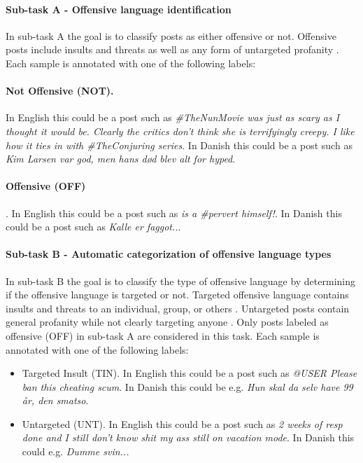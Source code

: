 \documentclass{article}
\begin{document}
\paragraph{Sub-task A - Offensive language identification}\label{ssec:offensEvalSubA}
In sub-task A the goal is to classify posts as either offensive or not. Offensive posts include insults and threats as well as any form of untargeted profanity \cite{zampieri2019semeval}. Each sample is annotated with one of the following labels:

\paragraph{Not Offensive (NOT).} In English this could be a post such as \textit{\#TheNunMovie was just as scary as I thought it would be. Clearly the critics don't think she is terrifyingly creepy. I like how it ties in with \#TheConjuring series}. In Danish this could be a post such as \textit{Kim Larsen var god, men hans d{\o}d blev alt for hyped}. 
\paragraph{Offensive (OFF)}. In English this could be a post such as \textit{\@USER is a \#pervert himself!}. In Danish this could be a post such as \textit{Kalle er faggot..}. 


\paragraph{Sub-task B - Automatic categorization of offensive language types}\label{ssec:offensEvalSubB}
In sub-task B the goal is to classify the type of offensive language by determining if the offensive language is targeted or not. Targeted offensive language contains insults and threats to an individual, group, or others \cite{zampieri2019semeval}. Untargeted posts contain general profanity while not clearly targeting anyone \cite{zampieri2019semeval}. Only posts labeled as offensive (OFF) in sub-task A are considered in this task. Each sample is annotated with one of the following labels:
\begin{itemize}
 \setlength\itemsep{-1mm}

    \item Targeted Insult (TIN). In English this could be a post such as \textit{@USER Please ban this cheating scum}. In Danish this could be e.g. \textit{Hun skal da selv have 99 år, den smatso}. 
    \item Untargeted (UNT). In English this could be a post such as \textit{2 weeks of resp done and I still don't know shit my ass still on vacation mode}. In Danish this could e.g. \textit{Dumme svin...}
\end{itemize}
\end{document}

